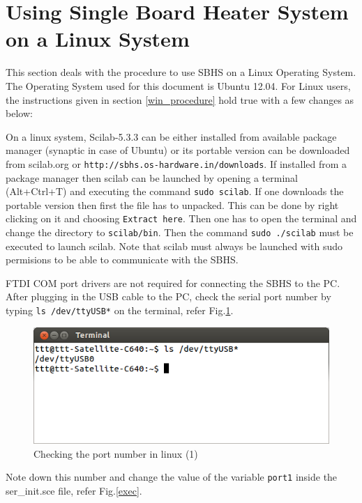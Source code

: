 \section{Using Single Board Heater System on a Linux System}\label{linux-sbhs}
This section deals with the procedure to use SBHS on a Linux Operating System. The Operating System used for this document is Ubuntu 12.04.
For Linux users, the instructions given in section \ref{win_procedure} hold true with a few changes as below:

 On a linux system, Scilab-5.3.3 can be either installed from available package manager (synaptic in case of Ubuntu) or its portable version can be downloaded from {scilab.org} or {\tt http://sbhs.os-hardware.in/downloads}. If installed from a package manager then scilab can be launched by opening a terminal (Alt+Ctrl+T) and executing the command {\tt sudo scilab}. If one downloads the portable version then first the file has to unpacked. This can be done by right clicking on it and choosing {\tt Extract here}. Then one has to open the terminal and change the directory to {\tt scilab/bin}. Then the command {\tt sudo ./scilab} must be executed to launch scilab. Note that scilab must always be launched with sudo permisions to be able to communicate with the SBHS.


FTDI COM port drivers are not required for connecting the SBHS to the PC. After plugging in the USB cable to the PC, check the serial port number by typing {\tt ls /dev/ttyUSB*} on the terminal, refer Fig.\ref{lstty}.
\begin{figure}
\centering
\includegraphics[width=0.7\linewidth]{using-sbhs/lstty.png}
\caption{Checking the port number in linux (1)}
\label{lstty}
\end{figure}

Note down this number and change the value of the variable {\tt port1} inside the {ser\_init.sce} file, refer Fig.\ref{exec}. 


